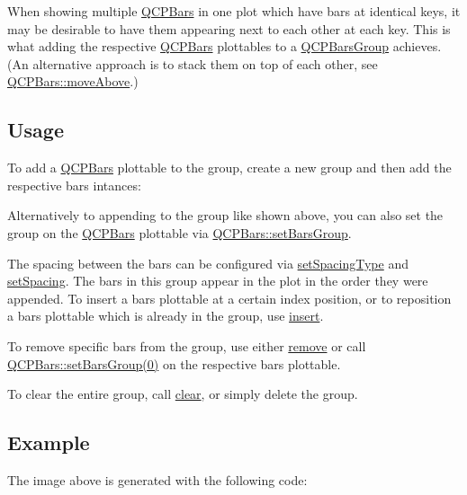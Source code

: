 When showing multiple \mbox{\hyperlink{class_q_c_p_bars}{Q\+C\+P\+Bars}} in one plot which have bars at identical keys, it may be desirable to have them appearing next to each other at each key. This is what adding the respective \mbox{\hyperlink{class_q_c_p_bars}{Q\+C\+P\+Bars}} plottables to a \mbox{\hyperlink{class_q_c_p_bars_group}{Q\+C\+P\+Bars\+Group}} achieves. (An alternative approach is to stack them on top of each other, see \mbox{\hyperlink{class_q_c_p_bars_ac22e00a6a41509538c21b04f0a57318c}{Q\+C\+P\+Bars\+::move\+Above}}.)\hypertarget{class_q_c_p_bars_group_qcpbarsgroup-usage}{}\subsection{Usage}\label{class_q_c_p_bars_group_qcpbarsgroup-usage}
To add a \mbox{\hyperlink{class_q_c_p_bars}{Q\+C\+P\+Bars}} plottable to the group, create a new group and then add the respective bars intances\+: 
\begin{DoxyCodeInclude}
\end{DoxyCodeInclude}
Alternatively to appending to the group like shown above, you can also set the group on the \mbox{\hyperlink{class_q_c_p_bars}{Q\+C\+P\+Bars}} plottable via \mbox{\hyperlink{class_q_c_p_bars_aedd1709061f0b307c47ddb45e172ef9a}{Q\+C\+P\+Bars\+::set\+Bars\+Group}}.

The spacing between the bars can be configured via \mbox{\hyperlink{class_q_c_p_bars_group_a2c7e2d61b10594a4555b615e1fcaf49e}{set\+Spacing\+Type}} and \mbox{\hyperlink{class_q_c_p_bars_group_aa553d327479d72a0c3dafcc724a190e2}{set\+Spacing}}. The bars in this group appear in the plot in the order they were appended. To insert a bars plottable at a certain index position, or to reposition a bars plottable which is already in the group, use \mbox{\hyperlink{class_q_c_p_bars_group_a309a5f7233db189f3ea9c2d04ece6c13}{insert}}.

To remove specific bars from the group, use either \mbox{\hyperlink{class_q_c_p_bars_group_a215e28a5944f1159013a0e19169220e7}{remove}} or call \mbox{\hyperlink{class_q_c_p_bars_aedd1709061f0b307c47ddb45e172ef9a}{Q\+C\+P\+Bars\+:\+:set\+Bars\+Group(0)}} on the respective bars plottable.

To clear the entire group, call \mbox{\hyperlink{class_q_c_p_bars_group_a3ddf23928c6cd89530bd34ab7ba7b177}{clear}}, or simply delete the group.\hypertarget{class_q_c_p_bars_group_qcpbarsgroup-example}{}\subsection{Example}\label{class_q_c_p_bars_group_qcpbarsgroup-example}
The image above is generated with the following code\+: 
\begin{DoxyCodeInclude}
\end{DoxyCodeInclude}


